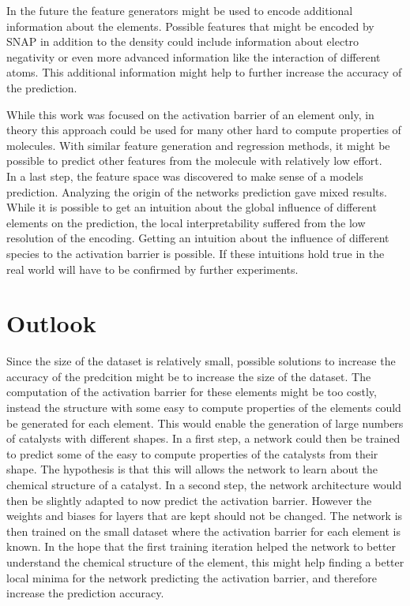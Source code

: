 In the future the feature generators might be used to encode additional information about the elements.
Possible features that might be encoded by SNAP in addition to the density could include information about 
electro negativity or even more advanced information like the interaction of different atoms.
This additional information might help to further increase the accuracy of the prediction.

While this work was focused on the activation barrier of an element only,
in theory this approach could be used for many other hard to compute properties of molecules.
With similar feature generation and regression methods, it might be possible 
to predict other features from the molecule with relatively low effort.
\\

In a last step, the feature space was discovered to make sense of a models prediction.
Analyzing the origin of the networks prediction gave mixed results.
While it is possible to get an intuition about the global influence of different elements on
the prediction, the local interpretability suffered from the low resolution of the encoding.
Getting an intuition about the influence of different species to the activation barrier is possible.
If these intuitions hold true in the real world will have to be confirmed by further experiments.

\section{Outlook}

Since the size of the dataset is relatively small, possible solutions to increase the accuracy of the predcition might be to 
increase the size of the dataset.
The computation of the activation barrier for these elements might be too costly, instead the structure with some easy to compute 
properties of the elements could be generated for each element.
This would enable the generation of large numbers of catalysts with different shapes.
In a first step, a network could then be trained to predict some of the easy to compute properties of the catalysts from their shape.
The hypothesis is that this will allows the network to learn about the chemical structure of a catalyst.
In a second step, the network architecture would then be slightly adapted to now predict the activation barrier.
However the weights and biases for layers that are kept should not be changed.
The network is then trained on the small dataset where the activation barrier for each element is known.
In the hope that the first training iteration helped the network to better understand the chemical structure of the element,
this might help finding a better local minima for the network predicting the activation barrier, and therefore increase the prediction accuracy.
\\

